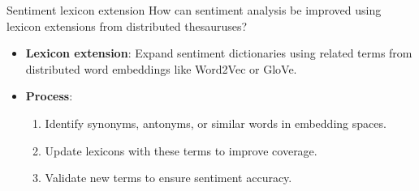 \documentclass{article}
\begin{document}
\begin{exercise}{Sentiment lexicon extension}
  How can sentiment analysis be improved using lexicon extensions from distributed thesauruses?

  \begin{solution}
    \begin{itemize}
        \item \textbf{Lexicon extension}: Expand sentiment dictionaries using related terms from distributed word embeddings like Word2Vec or GloVe.
        \item \textbf{Process}:
        \begin{enumerate}
            \item Identify synonyms, antonyms, or similar words in embedding spaces.
            \item Update lexicons with these terms to improve coverage.
            \item Validate new terms to ensure sentiment accuracy.
        \end{enumerate}
    \end{itemize}
  \end{solution}
\end{exercise}
\end{document}
